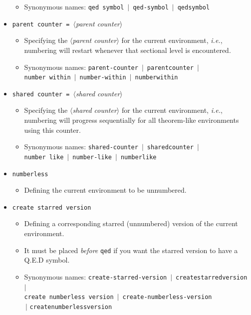 \documentclass[classical]{einfart}
\newcommand{\meta}[1]{$\langle${\normalfont\itshape#1}$\rangle$}
\newcommand{\commandoption}[1]{\texttt{\textcolor{code-keys}{#1}}}
\begin{document}
\begin{itemize}[label=,leftmargin=1.25em,itemindent=-1.25em]
\begin{itemize}
            \item Synonymous names: \commandoption{qed symbol} \,$|$\, \commandoption{qed-symbol} \,$|$\, \commandoption{qedsymbol}
        \end{itemize}
    \item \commandoption{parent counter}\lstinline| = |\meta{parent counter}
        \begin{itemize}
            \item Specifying the \meta{parent counter} for the current environment, \emph{i.e.}, numbering will restart whenever that sectional level is encountered.
            \item Synonymous names: \commandoption{parent-counter} \,$|$\, \commandoption{parentcounter} \,$|$\, \\\phantom{Synonymous names: }\commandoption{number within} \,$|$\, \commandoption{number-within} \,$|$\, \commandoption{numberwithin}
        \end{itemize}
    \item \commandoption{shared counter}\lstinline| = |\meta{shared counter}
        \begin{itemize}
            \item Specifying the \meta{shared counter} for the current environment, \emph{i.e.}, numbering will progress sequentially for all theorem-like environments using this counter.
            \item Synonymous names: \commandoption{shared-counter} \,$|$\, \commandoption{sharedcounter} \,$|$\, \\\phantom{Synonymous names: }\commandoption{number like} \,$|$\, \commandoption{number-like} \,$|$\, \commandoption{numberlike}
        \end{itemize}
    \item \commandoption{numberless}
        \begin{itemize}
            \item Defining the current environment to be unnumbered.
        \end{itemize}
    \item \commandoption{create starred version}
        \begin{itemize}
            \item Defining a corresponding starred (unnumbered) version of the current environment.
            \item It must be placed \emph{before} \commandoption{qed} if you want the starred version to have a Q.E.D symbol.
            \item Synonymous names: \commandoption{create-starred-version} \,$|$\, \commandoption{createstarredversion} \,$|$\, \\\phantom{Synonymous names: }\commandoption{create numberless version} \,$|$\, \commandoption{create-numberless-version} \\\phantom{Synonymous names: }\,$|$ \commandoption{createnumberlessversion}

\end{itemize}
\end{itemize}
\end{document}
